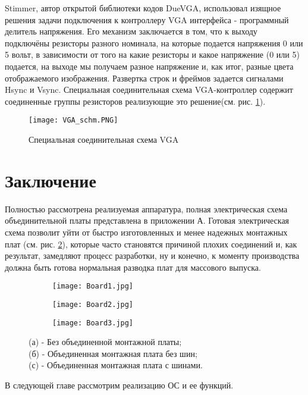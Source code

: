 Stimmer, автор открытой библиотеки кодов DueVGA, использовал изящное решения задачи подключения к контроллеру VGA интерфейса - программный делитель напряжения. Его механизм заключается в том, что к выходу подключёны  резисторы разного номинала, на которые подается напряжения 0 или 5 вольт, в зависимости от того на какие резисторы и какое напряжение (0 или 5) подается, на выходе мы получаем разное напряжение и, как итог, разные цвета отображаемого изображения. Развертка строк и фреймов задается сигналами Hsync и Vsync. Специальная соединительная схема VGA-контроллер содержит соединенные группы резисторов реализующие это решение(см. рис. \ref{fig:VGASchm}).
\begin{figure}[ht]
	\centering
     \texttt{[image: VGA\_schm.PNG]}
	\caption{Специальная соединительная схема VGA}
	\label{fig:VGASchm}
\end{figure}

\section{Заключение}
Полностью рассмотрена реализуемая аппаратура, полная электрическая схема объединительной платы представлена в приложении А. Готовая электрическая схема позволит уйти от быстро изготовленных и менее надежных монтажных плат (см. рис. \ref{fig:Boards}), которые часто становятся причиной плохих соединений и, как результат, замедляют процесс разработки, ну и конечно, к моменту производства должна быть готова нормальная разводка плат для массового выпуска.

\begin{figure}[ht]
    \centering
    \begin{subfigure}[b]{0.3\textwidth}
    \centering
        \texttt{[image: Board1.jpg]}
        \caption{}
    \end{subfigure}
    \begin{subfigure}[b]{0.3\textwidth}
    \centering
        \texttt{[image: Board2.jpg]}
        \caption{}
    \end{subfigure}
    \begin{subfigure}[b]{0.3\textwidth}
    \centering
        \texttt{[image: Board3.jpg]}
        \caption{}
    \end{subfigure}
    \caption{ (а) - Без объединенной монтажной платы;\\(б) - Объединенная монтажная плата без шин;\\(с) - Объединенная монтажная плата с шинами.}
    \label{fig:Boards}
\end{figure}
В следующей главе рассмотрим реализацию ОС и ее функций.